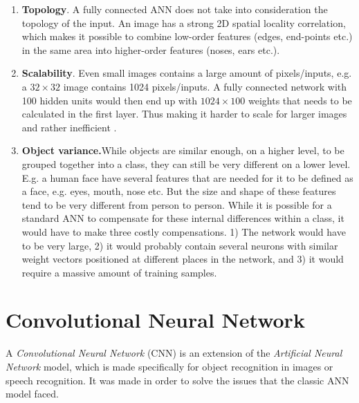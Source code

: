 \begin{enumerate}

	\item \textbf{Topology}. A fully connected ANN does not take into consideration the topology of the input. An image has a strong 2D spatial locality correlation, which makes it possible to combine low-order features (edges, end-points etc.) in the same area into higher-order features (noses, ears etc.).  
	
	\item \textbf{Scalability}. Even small images contains a large amount of pixels/inputs, e.g. a $ 32 \times 32 $ image contains 1024 pixels/inputs. A fully connected network with 100 hidden units would then end up with $ 1024 \times 100 $ weights that needs to be calculated in the first layer. Thus making it harder to scale for larger images and rather inefficient .
	
	\item \textbf{Object variance.}While objects are similar enough, on a higher level, to be grouped together into a class, they can still be very different on a lower level. E.g. a human face have several features that are needed for it to be defined as a face, e.g. eyes, mouth, nose etc. But the size and shape of these features tend to be very different from person to person. While it is possible for a standard ANN to compensate for these internal differences within a class, it would have to make three costly compensations. 1) The network would have to be very large, 2) it would probably contain several neurons with similar weight vectors positioned at different places in the network, and 3)  it would require a massive amount of training samples. 
	
\end{enumerate}



\section{Convolutional Neural Network}\label{sec_cnn}

A \textit{Convolutional Neural Network} \cite{LeCun1998} (CNN) is an extension of the \textit{Artificial Neural Network} model, which is made specifically for object recognition in images or speech recognition. It was made in order to solve the issues that the classic ANN model faced. 


